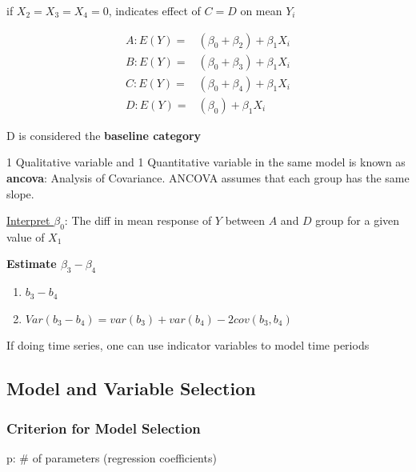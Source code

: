 \documentclass[11pt]{article}
\begin{document}
if \(X_2 = X_3 = X_4 = 0\), indicates effect of \(C = D\) on mean \(Y_i\)

\begin{equation}
\begin{split}
A: E(Y) = & (\beta_0 + \beta_2) + \beta_1 X_i\\
B: E(Y) = & (\beta_0 + \beta_3) + \beta_1 X_i\\
C: E(Y) = & (\beta_0 + \beta_4) + \beta_1 X_i\\
D: E(Y) = & (\beta_0) + \beta_1 X_i
\end{split}
\end{equation}

D is considered the \textbf{baseline category}

1 Qualitative variable and 1 Quantitative variable in the same model is known as
\textbf{ancova}: Analysis of Covariance. ANCOVA assumes that each group has the same slope.


\uline{Interpret \(\beta_0\)}: The diff in mean response of \(Y\) between \(A\) and \(D\)
group for a given value of \(X_1\)

\textbf{Estimate \(\beta_3 - \beta_4\)}
\begin{enumerate}
\item \(b_3 - b_4\)
\item \(Var(b_3 - b_4) = var(b_3) + var(b_4) - 2 cov(b_3, b_4)\)
\end{enumerate}

If doing time series, one can use indicator variables to model time periods

\subsection{Model and Variable Selection}
\label{sec:orgc47e2e4}
\subsubsection{Criterion for Model Selection}
\label{sec:orge7b7bf1}
p: \# of parameters (regression coefficients)
\end{document}
